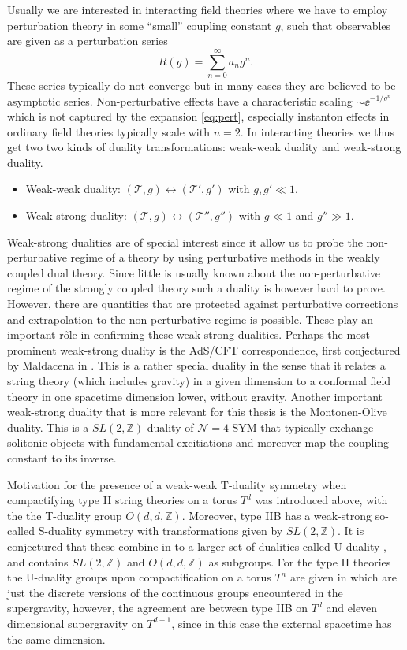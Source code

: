 Usually we are interested in interacting field theories where we have to employ perturbation theory in some ``small'' coupling constant $g$, such that observables are given as a perturbation series
\begin{equation}\label{eq:pert}
    R(g) = \sum_{n=0}^{\infty}a_n g^n.
\end{equation}
These series typically do not converge but in many cases they are believed to be asymptotic series. Non-perturbative effects have a characteristic scaling $\sim \ee^{-1/g^n}$ which is not captured by the expansion \eqref{eq:pert}, especially instanton effects in ordinary field theories typically scale with $n=2$. In interacting theories we thus get two two kinds of duality transformations: weak-weak duality and weak-strong duality. 
\begin{itemize}
    \item Weak-weak duality: $\left(\mathscr{T},g\right)\leftrightarrow\left(\mathscr{T}',g'\right)$ with $g,g'\ll 1$.
    \item Weak-strong duality: $\left(\mathscr{T},g\right)\leftrightarrow\left(\mathscr{T}'',g''\right)$ with $g\ll 1$ and $g''\gg 1$.
\end{itemize}
Weak-strong dualities are of special interest since it allow us to probe the non-perturbative regime of a theory by using perturbative methods in the weakly coupled dual theory. Since little is usually known about the non-perturbative regime of the strongly coupled theory such a duality is however hard to prove. However, there are quantities that are protected against perturbative corrections and extrapolation to the non-perturbative regime is possible. These play an important rôle in confirming these weak-strong dualities. Perhaps the most prominent weak-strong duality is the AdS/CFT correspondence, first conjectured by Maldacena in \cite{Maldacena1999}. This is a rather special duality in the sense that it relates a string theory (which includes gravity) in a given dimension to a conformal field theory in one spacetime dimension lower, without gravity. Another important weak-strong duality that is more relevant for this thesis is the Montonen-Olive duality. This is a $SL(2,\mathbb{Z})$ duality of $\mathcal{N}=4$ SYM that typically exchange solitonic objects with fundamental excitiations and moreover map the coupling constant to its inverse. 

Motivation for the presence of a weak-weak T-duality symmetry when compactifying type II string theories on a torus $T^d$ was introduced above, with the the T-duality group $O(d,d,\mathbb{Z})$. Moreover, type IIB has a weak-strong so-called S-duality symmetry with transformations given by $SL(2,\mathbb{Z})$. It is conjectured that these combine in to a larger set of dualities called U-duality \cite{Hull:1994ys}, and contains $SL(2,\mathbb{Z})$ and $O(d,d,\mathbb{Z})$ as subgroups. For the type II theories the U-duality groups upon compactification on a torus $T^{n}$ are given in  which are just the discrete versions of the continuous groups encountered in the supergravity, however, the agreement are between type IIB on $T^{d}$ and eleven dimensional supergravity on $T^{d+1}$, since in this case the external spacetime has the same dimension. 

